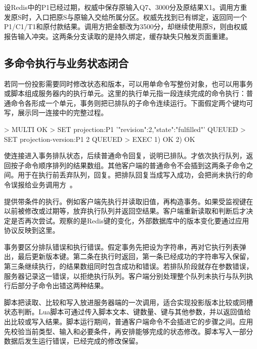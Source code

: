 设Redis中的P1已经过期，权威中保存原输入Q7、3000分及原结果X1。调用方重发原S时，入口把原S与原输入交给所属分区。权威先找到已有绑定，返回同一个P1/C1/T1和原付款结果。调用方把金额改为3500分，却继续使用原S，则由权威报告输入冲突。这两条分支读取的是持久绑定，缓存缺失只触发页面重建。

\subsection{多命令执行与业务状态闭合}

若同一份投影需要同时修改状态和版本，可以用单命令写整份对象，也可以用事务或脚本组成服务器内的执行单元。这里的执行单元指一段连续完成的命令执行：普通命令各形成一个单元，事务则把已排队的子命令连续运行。下面假定两个键均可写，展示同一连接中的完整过程。

\begin{BookCode}
> MULTI
OK
> SET projection:P1 '{"revision":2,"state":"fulfilled"}'
QUEUED
> SET projection-version:P1 2
QUEUED
> EXEC
1) OK
2) OK
\end{BookCode}

使连接进入事务排队状态，后续普通命令回复，说明已排队。才依次执行队列，返回按子命令顺序排列的结果数组。其他客户端的普通命令不会插到这两条子命令之间。用于在执行前丢弃队列，回复。把排队回复当成写入成功，会把尚未执行的命令误报给业务调用方~\cite{redis8102-transactions}。

提供带条件的执行。例如客户端先执行并读取旧值，再构造事务。如果受监视键在以前被修改或过期等，放弃执行队列并返回空结果。客户端重新读取和判断后才决定是否再次尝试。观察的是Redis键的变化，外部数据库中的版本变化要通过应用协议反映到这里。

事务要区分排队错误和执行错误。假定事务先把设为字符串，再对它执行列表弹出，最后更新版本键。第二条在执行时返回，第一条已经成功的字符串写入保留，第三条继续执行，的结果数组同时包含成功和错误。若排队阶段就存在参数错误，服务器记录这一错误，以拒绝执行队列。客户端分别处理整个队列未执行与队列执行后部分子命令出错这两种结果。


脚本把读取、比较和写入放进服务器端的一次调用，适合实现投影版本比较或同槽状态判断。Lua脚本可通过传入脚本文本、键数量、键与其他参数，并以返回值给出比较或写入结果。脚本运行期间，普通客户端命令不会插进它的步骤之间。应用先校验当前类型、输入和必要条件，再安排能够完成的状态修改。脚本写入一部分数据后发生运行错误，已经完成的修改保留。

